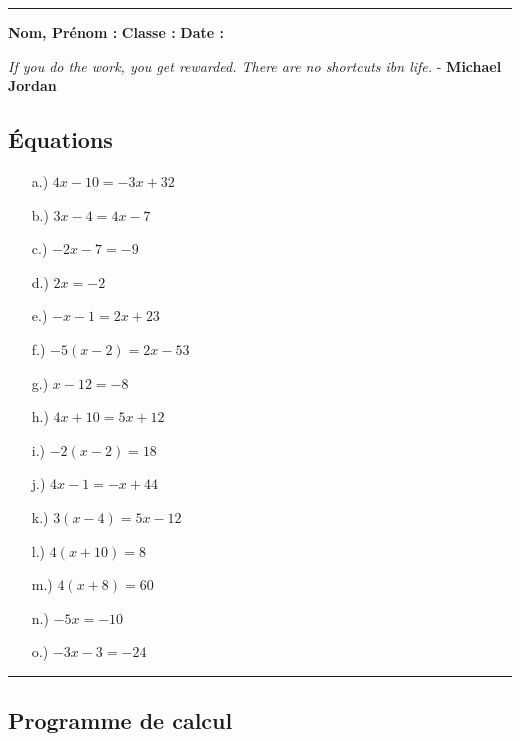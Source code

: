 \documentclass[11pt]{article}
\newcommand{\horrule}[1]{\rule{\linewidth}{#1}} %
\begin{document}
\vspace{1cm}
\horrule{1px}
\vspace{1cm}

\textbf{Nom, Prénom :} \hspace{8cm} \textbf{Classe :} \hspace{3cm} \textbf{Date :}\\
\vspace{-0.8cm}
\begin{center}
  \textit{If you do the work, you get rewarded. There are no shortcuts ibn life.}  - \textbf{Michael Jordan}
\end{center}
\vspace{-0.8cm}

\subsection*{Équations}
\begin{multicols}{3}\noindent
  \begin{enumerate}
  \item[a.)] $	4x - 10 = -3x + 32$
  \item[b.)] $3x - 4 = 4x - 7$
  \item[c.)] $-2x - 7 = -9$
  \item[d.)] $2x = -2$
  \item[e.)] $	-x - 1 = 2x + 23$
  \item[f.)] $-5(x - 2) = 2x - 53$
  \item[g.)] $	x - 12 = -8$
  \item[h.)] $4x + 10 = 5x + 12$
  \item[i.)] $-2(x - 2) = 18$
  \item[j.)] $4x - 1 = -x + 44$
  \item[k.)] $	3(x - 4) = 5x - 12$
  \item[l.)] $	4(x + 10) = 8$
  \item[m.)] $4(x + 8) = 60$
  \item[n.)] $-5x = -10$
  \item[o.)] $-3x - 3 = -24$
  \end{enumerate}
\end{multicols}

\vspace{-0.4cm}
\horrule{1px}
\vspace{-0.8cm}

\subsection*{Programme de calcul}
\end{document}
